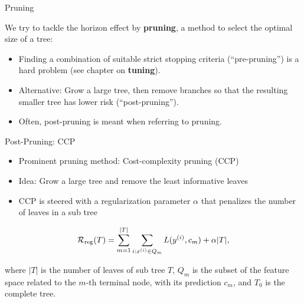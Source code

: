 \documentclass[11pt,compress,t,notes=noshow, xcolor=table]{beamer}
\begin{document}
\begin{vbframe}{Pruning}

We try to tackle the horizon effect by \textbf{pruning}, a method to select the optimal size of a tree:

\begin{itemize}
\item Finding a combination of suitable strict stopping criteria (\enquote{pre-pruning}) is a hard problem (see chapter on \textbf{tuning}).
\item Alternative: Grow a large tree, then remove branches so that the resulting smaller tree has lower risk (\enquote{post-pruning}).
\item Often, post-pruning is meant when referring to pruning.

\end{itemize}
\end{vbframe}

\begin{vbframe}{Post-Pruning: CCP}
\begin{itemize}
\item Prominent pruning method: Cost-complexity pruning (CCP)
\item Idea: Grow a large tree and remove the least informative leaves
\item CCP is steered with a regularization parameter $\alpha$ that penalizes the number of leaves in a sub tree  %
\end{itemize}

$$\mathcal{R}_{\text{reg}}(T) = \sum_{m=1}^{|T|} \sum_{i: x^{(i)} \in Q_m} L(y^{(i)}, c_m) + \alpha |T|,$$

where $|T|$ is the number of leaves of sub tree $T$, $Q_m$ is the subset of the feature space related to the $m$-th terminal node, with its prediction $c_m$, and $T_0$ is the complete tree.

\end{vbframe}
\end{document}
